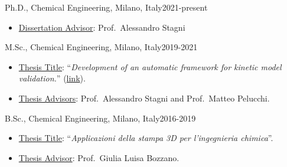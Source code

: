 \begin{position}{Ph.D., Chemical Engineering}{\polimi, Milano, Italy}{2021-present}
   \begin{itemize}
      \item[ ] \ul{Dissertation Advisor}: Prof.\ Alessandro Stagni
   \end{itemize}
\end{position}

\begin{position}{M.Sc., Chemical Engineering}{\polimi, Milano, Italy}{2019-2021}
   \begin{itemize}
      \item[ ] \ul{Thesis Title}: ``{\it Development of an automatic framework for kinetic
         model validation.}'' (\href{https://hdl.handle.net/10589/179004}{link}).
      \item[ ] \ul{Thesis Advisors}: Prof.\ Alessandro Stagni and Prof.\ Matteo Pelucchi.
   \end{itemize}
\end{position}

\begin{position}{B.Sc., Chemical Engineering}{\polimi, Milano, Italy}{2016-2019}
   \begin{itemize}
      \item[ ] \ul{Thesis Title}: ``{\it Applicazioni della stampa 3D per l'ingegnieria chimica}''.
      \item[ ] \ul{Thesis Advisor}: Prof.\ Giulia Luisa Bozzano.
   \end{itemize}
\end{position}

